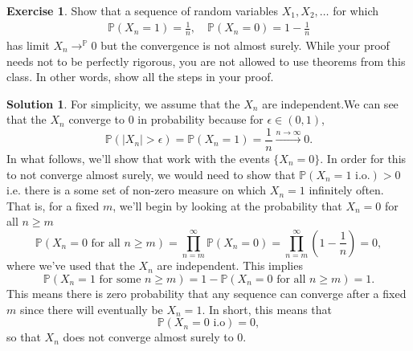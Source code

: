 \documentclass[12pt]{article}
\newcommand{\Prob}{\mathbb{P}}
\newcommand{\abs}[1]{ \left| #1 \right| }
\theoremstyle{definition}
\newtheorem{exer}{Exercise}
\newtheorem{sol}{Solution}
\theoremstyle{remark}
\begin{document}
\newpage

\begin{exer}
    Show that a sequence of random variables $X_{1}, X_{2}, \ldots$ for which
    \begin{align*}
        \Prob(X_{n} = 1) = \frac{1}{n}, \quad \Prob(X_{n} = 0) = 1 - \frac{1}{n}
    \end{align*}
    has limit $X_{n} \to^{\Prob} 0$ but the convergence is not almost surely. While your proof needs not to be perfectly rigorous, you are not allowed to use theorems from this class. In other words, show all the steps in your proof.
\end{exer}

\begin{sol}

    For simplicity, we assume that the $X_{n}$ are independent.We can see that the $X_{n}$ converge to 0 in probability because for $\epsilon \in (0,1)$,
\begin{equation*}
    \Prob(\abs{X_{n}} > \epsilon) =  \Prob(X_{n} = 1) = \frac{1}{n} \xrightarrow{n \to \infty} 0.
\end{equation*}
In what follows, we'll show that work with the events $\{ X_{n} = 0 \}$. In order for this to not converge almost surely, we would need to show that $\Prob( X_{n} = 1 \text{ i.o.} ) > 0$ i.e. there is a some set of non-zero measure on which $X_{n} = 1$ infinitely often. That is, for a fixed $m$, we'll begin by looking at the probability that $X_{n} = 0$ for all $n \geq m$
\begin{equation*}
    \Prob(X_{n} = 0 \text{ for all } n \geq m) = \prod_{n = m}^{\infty} \Prob(X_{n} = 0) = \prod_{n=m}^{\infty} \left(1 - \frac{1}{n}\right) = 0,
\end{equation*} 
where we've used that the $X_{n}$ are independent. This implies 
\begin{equation*}
    \Prob( X_{n} = 1 \text{ for some } n\geq m) = 1 -  \Prob(X_{n} = 0 \text{ for all } n \geq m)  = 1.
\end{equation*}
This means there is zero probability that any sequence can converge after a fixed $m$ since there will eventually be $X_{n} = 1$. In short, this means that
\begin{equation*}
    \Prob( X_{n} = 0 \text{ i.o} ) = 0,
\end{equation*}
so that $X_{n}$ does not converge almost surely to 0.
\end{sol}
\end{document}
